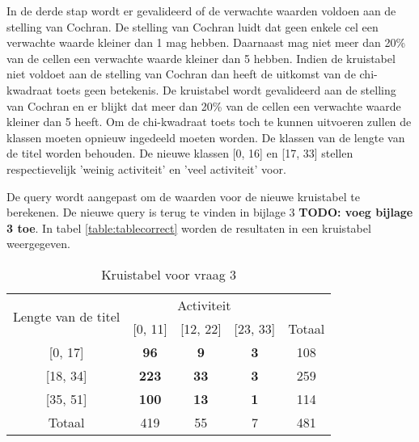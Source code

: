 In de derde stap wordt er gevalideerd of de verwachte waarden voldoen aan de stelling van Cochran. De stelling van Cochran luidt dat geen enkele cel een verwachte waarde kleiner dan 1 mag hebben. Daarnaast mag niet meer dan 20\% van de cellen een verwachte waarde kleiner dan 5 hebben. Indien de kruistabel niet voldoet aan de stelling van Cochran dan heeft de uitkomst van de chi-kwadraat toets geen betekenis. De kruistabel wordt gevalideerd aan de stelling van Cochran en er blijkt dat meer dan 20\% van de cellen een verwachte waarde kleiner dan 5 heeft. Om de chi-kwadraat toets toch te kunnen uitvoeren zullen de klassen moeten opnieuw ingedeeld moeten worden. De klassen van de lengte van de titel worden behouden. De nieuwe klassen [0, 16] en [17, 33] stellen respectievelijk 'weinig activiteit' en 'veel activiteit' voor. {De query wordt aangepast om de waarden voor de nieuwe kruistabel te berekenen. De nieuwe query is terug te vinden in bijlage 3 \textbf{TODO: voeg bijlage 3 toe}. In tabel \ref{table:tablecorrect} worden de resultaten in een kruistabel weergegeven.

\begin{table}[]
	\centering
	\begin{tabular}{|c|c|c|c|c|}
		\hline
		\multirow{2}{*}{Lengte van de titel} & \multicolumn{3}{c|}{Activiteit}            & \multicolumn{1}{l|}{} \\ \cline{2-5} 
		& {[}0, 11{]}  & {[}12, 22{]} & {[}23, 33{]} & Totaal                \\ \hline
		{[}0, 17{]}                          & \textbf{96}  & \textbf{9}   & \textbf{3}   & 108                   \\ \hline
		{[}18, 34{]}                         & \textbf{223} & \textbf{33}  & \textbf{3}   & 259                   \\ \hline
		{[}35, 51{]}                         & \textbf{100} & \textbf{13}  & \textbf{1}   & 114                   \\ \hline
		Totaal                               & 419          & 55           & 7            & 481                   \\ \hline
	\end{tabular}
	\caption{Kruistabel voor vraag 3}
	\label{table:tablewrong}
\end{table}

}
